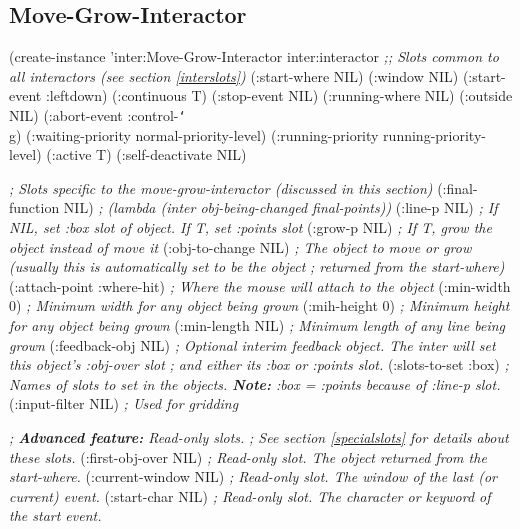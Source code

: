 \begin{group}
\section{Move-Grow-Interactor}
\label{MOVEGROWINTER}

\begin{programexample}
(create-instance 'inter:Move-Grow-Interactor inter:interactor
  {\it ;; Slots common to all interactors (see section \ref{interslots})}
  (:start-where NIL)
  (:window NIL)
  (:start-event :leftdown)
  (:continuous T)
  (:stop-event NIL)
  (:running-where NIL)
  (:outside NIL)
  (:abort-event :control-{\tt\char`\\}g)
  (:waiting-priority normal-priority-level)
  (:running-priority running-priority-level)
  (:active T)
  (:self-deactivate NIL)

  {\it ; Slots specific to the move-grow-interactor (discussed in this section)}
  (:final-function NIL)      {\it ; (lambda (inter obj-being-changed final-points))}
  (:line-p NIL)              {\it ; If NIL, set :box slot of object.  If T, set :points slot}
  (:grow-p NIL)              {\it ; If T, grow the object instead of move it}
  (:obj-to-change NIL)       {\it ; The object to move or grow (usually this is automatically set to be the object}
                             {\it ; returned from the start-where)}
  (:attach-point :where-hit) {\it ; Where the mouse will attach to the object}
  (:min-width 0)             {\it ; Minimum width for any object being grown}
  (:mih-height 0)            {\it ; Minimum height for any object being grown}
  (:min-length NIL)          {\it ; Minimum length of any line being grown}
  (:feedback-obj NIL)        {\it ; Optional interim feedback object.  The inter will set this object's :obj-over slot}
                             {\it ; and either its :box or :points slot.}
  (:slots-to-set :box)       {\it ; Names of slots to set in the objects. {\bf Note:} :box = :points because of :line-p slot.}
  (:input-filter NIL)        {\it ; Used for gridding}

  {\it ; {\bf Advanced feature:}  Read-only slots.}
  {\it ; See section \ref{specialslots} for details about these slots.}
  (:first-obj-over NIL)     {\it ; Read-only slot.  The object returned from the start-where.}
  (:current-window NIL)     {\it ; Read-only slot.  The window of the last (or current) event.}
  (:start-char NIL)         {\it ; Read-only slot.  The character or keyword of the start event.}


\end{programexample}
\end{group}
